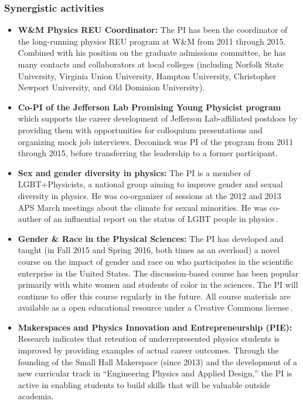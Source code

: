 
\subsubsection*{Synergistic activities}
\begin{itemize}
 \setlength{\itemsep}{0pt}
 \setlength{\parskip}{0pt}
 \setlength{\parsep}{0pt}

 \item {\bf W\&M Physics REU Coordinator:} The PI has been the coordinator of the long-running physics REU program at W\&M from 2011 through 2015. Combined with his position on the graduate admissions committee, he has many contacts and collaborators at local colleges (including Norfolk State University, Virginia Union University, Hampton University, Christopher Newport University, and Old Dominion University).

 \item {\bf Co-PI of the Jefferson Lab Promising Young Physicist program} which supports the career development of Jefferson Lab-affiliated postdocs by providing them with opportunities for colloquium presentations and organizing mock job interviews. Deconinck was PI of the program from 2011 through 2015, before transferring the leadership to a former participant.

 \item {\bf Sex and gender diversity in physics:} The PI is a member of LGBT+Physicists, a national group aiming to improve gender and sexual diversity in physics.  He was co-organizer of sessions at the 2012 and 2013 APS March meetings about the climate for sexual minorities. He was co-auther of an influential report on the status of LGBT people in physics\,\cite{APS:LGBT2016}.
 
 \item {\bf Gender \& Race in the Physical Sciences:} The PI has developed and taught (in Fall 2015 and Spring 2016, both times as an overload) a novel course on the impact of gender and race on who participates in the scientific enterprise in the United States. The discussion-based course has been popular primarily with white women and students of color in the sciences. The PI will continue to offer this course regularly in the future. All course materials are available as a open educational resource under a Creative Commons license\,\cite{CC-BY-SA}.
 
 \item {\bf Makerspaces and Physics Innovation and Entrepreneurship (PIE):} Research indicates that retention of underrepresented physics students is improved by providing examples of actual career outcomes. Through the founding of the Small Hall Makerspace (since 2013) and the development of a new curricular track in ``Engineering Physics and Applied Design,'' the PI is active in enabling students to build skills that will be valuable outside academia.

\end{itemize}
